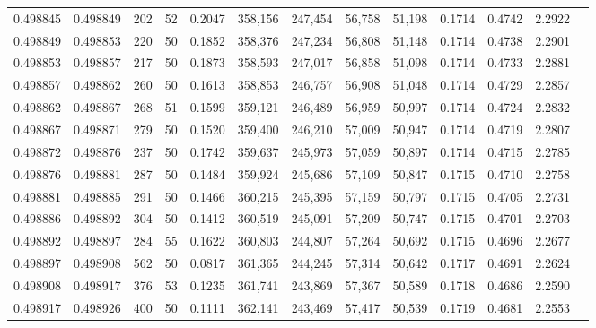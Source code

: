 \begin{tabular}{rrrrrrrrrrrrr}
0.498845 & 0.498849 & 202 &  52 &                                     0.2047 & 358,156 & 247,454 &  56,758 &  51,198 & 0.1714 & 0.4742 & 2.2922 \\
0.498849 & 0.498853 & 220 &  50 &                                     0.1852 & 358,376 & 247,234 &  56,808 &  51,148 & 0.1714 & 0.4738 & 2.2901 \\
0.498853 & 0.498857 & 217 &  50 &                                     0.1873 & 358,593 & 247,017 &  56,858 &  51,098 & 0.1714 & 0.4733 & 2.2881 \\
0.498857 & 0.498862 & 260 &  50 &                                     0.1613 & 358,853 & 246,757 &  56,908 &  51,048 & 0.1714 & 0.4729 & 2.2857 \\
0.498862 & 0.498867 & 268 &  51 &                                     0.1599 & 359,121 & 246,489 &  56,959 &  50,997 & 0.1714 & 0.4724 & 2.2832 \\
0.498867 & 0.498871 & 279 &  50 &                                     0.1520 & 359,400 & 246,210 &  57,009 &  50,947 & 0.1714 & 0.4719 & 2.2807 \\
0.498872 & 0.498876 & 237 &  50 &                                     0.1742 & 359,637 & 245,973 &  57,059 &  50,897 & 0.1714 & 0.4715 & 2.2785 \\
0.498876 & 0.498881 & 287 &  50 &                                     0.1484 & 359,924 & 245,686 &  57,109 &  50,847 & 0.1715 & 0.4710 & 2.2758 \\
0.498881 & 0.498885 & 291 &  50 &                                     0.1466 & 360,215 & 245,395 &  57,159 &  50,797 & 0.1715 & 0.4705 & 2.2731 \\
0.498886 & 0.498892 & 304 &  50 &                                     0.1412 & 360,519 & 245,091 &  57,209 &  50,747 & 0.1715 & 0.4701 & 2.2703 \\
0.498892 & 0.498897 & 284 &  55 &                                     0.1622 & 360,803 & 244,807 &  57,264 &  50,692 & 0.1715 & 0.4696 & 2.2677 \\
0.498897 & 0.498908 & 562 &  50 &                                     0.0817 & 361,365 & 244,245 &  57,314 &  50,642 & 0.1717 & 0.4691 & 2.2624 \\
0.498908 & 0.498917 & 376 &  53 &                                     0.1235 & 361,741 & 243,869 &  57,367 &  50,589 & 0.1718 & 0.4686 & 2.2590 \\
0.498917 & 0.498926 & 400 &  50 &                                     0.1111 & 362,141 & 243,469 &  57,417 &  50,539 & 0.1719 & 0.4681 & 2.2553 \\

\end{tabular}
